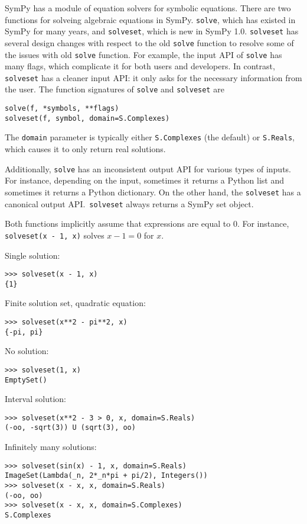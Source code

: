 SymPy has a module of equation solvers for symbolic equations. There are two
functions for solveing algebraic equations in SymPy. \texttt{solve}, which has
existed in SymPy for many years, and \texttt{solveset}, which is new in SymPy 1.0.
\texttt{solveset} has several design changes with respect to the old
\texttt{solve} function to resolve some of the issues with old \texttt{solve}
function. For example, the input API of \texttt{solve} has many flags, which
complicate it for both users and developers. In contrast, \texttt{solveset} has a
cleaner input API\@:  it only asks for the necessary information from the user.
The function signatures of \texttt{solve} and \texttt{solveset} are
\begin{verbatim}
solve(f, *symbols, **flags)
solveset(f, symbol, domain=S.Complexes)
\end{verbatim}
The \texttt{domain} parameter is typically either \texttt{S.Complexes} (the
default) or \texttt{S.Reals}, which causes it to only return real solutions.

Additionally, \texttt{solve} has an inconsistent output API for various types
of inputs. For instance, depending on the input, sometimes it returns a Python
list and sometimes it returns a Python dictionary. On the other hand, the
\texttt{solveset} has a canonical output API.\ \texttt{solveset} always returns
a SymPy set object.

Both functions implicitly assume that expressions are equal to 0. For
instance, \texttt{solveset(x - 1, x)} solves $x - 1 = 0$ for $x$.

\noindent Single solution:
\begin{verbatim}
>>> solveset(x - 1, x)
{1}
\end{verbatim}

\noindent Finite solution set, quadratic equation:
\begin{verbatim}
>>> solveset(x**2 - pi**2, x)
{-pi, pi}
\end{verbatim}

\noindent No solution:
\begin{verbatim}
>>> solveset(1, x)
EmptySet()
\end{verbatim}

\noindent Interval solution:
\begin{verbatim}
>>> solveset(x**2 - 3 > 0, x, domain=S.Reals)
(-oo, -sqrt(3)) U (sqrt(3), oo)
\end{verbatim}

\noindent Infinitely many solutions:
\begin{verbatim}
>>> solveset(sin(x) - 1, x, domain=S.Reals)
ImageSet(Lambda(_n, 2*_n*pi + pi/2), Integers())
>>> solveset(x - x, x, domain=S.Reals)
(-oo, oo)
>>> solveset(x - x, x, domain=S.Complexes)
S.Complexes
\end{verbatim}

